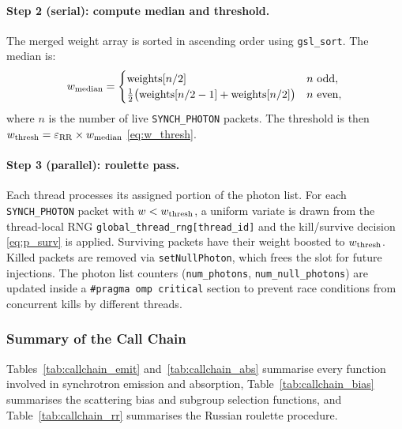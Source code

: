 \documentclass[12pt,a4paper]{article}
\newcommand{\code}[1]{\texttt{#1}}
\begin{document}
\paragraph{Step 2 (serial): compute median and threshold.}
The merged weight array is sorted in ascending order using
\code{gsl\_sort}.  The median is:
\begin{equation}
	w_{\rm median} = \begin{cases}
		\mathrm{weights}[n/2] & n \text{ odd}, \\
		\tfrac{1}{2}\bigl(\mathrm{weights}[n/2-1]
		+ \mathrm{weights}[n/2]\bigr) & n \text{ even},
	\end{cases}
	\label{eq:median}
\end{equation}
where $n$ is the number of live \code{SYNCH\_PHOTON} packets.  The
threshold is then $w_{\rm thresh} = \varepsilon_{\rm RR} \times
w_{\rm median}$ \eqref{eq:w_thresh}.

\paragraph{Step 3 (parallel): roulette pass.}
Each thread processes its assigned portion of the photon list.  For each
\code{SYNCH\_PHOTON} packet with $w < w_{\rm thresh}$, a uniform variate
is drawn from the thread-local RNG \code{global\_thread\_rng[thread\_id]}
and the kill/survive decision \eqref{eq:p_surv} is applied.  Surviving
packets have their weight boosted to $w_{\rm thresh}$.  Killed packets
are removed via \code{setNullPhoton}, which frees the slot for future
injections.  The photon list counters
(\code{num\_photons}, \code{num\_null\_photons}) are updated inside a
\code{\#pragma omp critical} section to prevent race conditions from
concurrent kills by different threads.

\subsubsection{Summary of the Call Chain}
\label{sec:callchain}

Tables~\ref{tab:callchain_emit} and~\ref{tab:callchain_abs} summarise
every function involved in synchrotron emission and absorption,
Table~\ref{tab:callchain_bias} summarises the scattering bias and
subgroup selection functions, and Table~\ref{tab:callchain_rr}
summarises the Russian roulette procedure.
\end{document}

